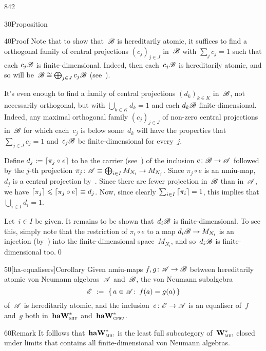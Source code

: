 \begin{parsec}{842}
\begin{point}{30}{Proposition}
\begin{point}{40}{Proof}
Note that to show that~$\mathscr{B}$ is hereditarily atomic,
it suffices to find a orthogonal family of central
projections $(c_j)_{j\in J}$ in~$\mathscr{B}$
with $\sum_j c_j=1$ 
such that  each $c_j\mathscr{B}$ is finite-dimensional.
Indeed, then each~$c_j\mathscr{B}$ is hereditarily atomic,
and so will be~$\mathscr{B}\cong \bigoplus_{j\in J} c_j\mathscr{B}$
(see~).

It's even enough to find a family of central projections
$(d_k)_{k\in K}$ in~$\mathscr{B}$,
not necessarily orthogonal, but
with $\bigcup_{k\in K} d_k =1$
and each $d_k\mathscr{B}$  finite-dimensional.
Indeed, any maximal orthogonal 
family $(c_j)_{j\in J}$
of non-zero central projections in~$\mathscr{B}$
for which each~$c_j$ is below some~$d_k$
will have the properties
that $\sum_{j\in J} c_j =1$
and~$c_j\mathscr{B}$ be finite-dimensional for every~$j$.

Define $d_j := \left\lceil\pi_j\circ e\right\rceil$
to be the carrier (see~)
of the inclusion $e\colon \mathscr{B}\to\mathscr{A}$
followed by the $j$-th projection
$\pi_j\colon \mathscr{A}\equiv\bigoplus_{i\in I}M_{N_i}\to M_{N_j}$.
Since $\pi_j\circ e$ is an nmiu-map,
    $d_j$ is a central projection by~.
Since there are fewer projection in~$\mathscr{B}$ than in~$\mathscr{A}$,
we have $\left\lceil\pi_j\right\rceil\leqslant \left\lceil\pi_j\circ e\right\rceil\equiv d_j$.
Now, since clearly $\sum_{i\in I}\left\lceil\pi_i\right\rceil=1$,
this implies that $\bigcup_{i\in I} d_i =1$.

Let~$i\in I$ be given.
It remains to be shown that~$d_i\mathscr{B}$ is finite-dimensional.
To see this, simply note that the restriction
of $\pi_i\circ e$ to a map $d_i\mathscr{B} \to M_{N_i}$
    is an injection (by~)
    into the finite-dimensional space~$M_{N_i}$,
    and so~$d_i\mathscr{B}$ is finite-dimensional too.\qed
\end{point}
\end{point}
\begin{point}{50}[ha-equalisers]{Corollary}%
Given nmiu-maps
$f,g\colon \mathscr{A}\to\mathscr{B}$
between hereditarily atomic
von Neumann algebras~$\mathscr{A}$ and~$\mathscr{B}$,
the von Neumann subalgebra
\begin{equation*}
    \mathscr{E} \ :=\  \{\,a\in\mathscr{A}\colon\, f(a)=g(a)\,\}
\end{equation*}
of~$\mathscr{A}$
is hereditarily atomic,
and the inclusion~$e\colon \mathscr{E}\to\mathscr{A}$
is an equaliser of~$f$ and~$g$ both in~$\mathbf{haW}^*_{\text{\textsc{miu}}}$
and~$\mathbf{haW}^*_{\text{\textsc{cpsu}}}$.
\end{point}
\begin{point}{60}{Remark}%
It folllows that~$\mathbf{haW}^*_{\text{\textsc{miu}}}$
is the least full subcategory of~$\mathbf{W}^*_{\text{\textsc{miu}}}$
closed under limits
that contains all finite-dimensional von Neumann algebras.
\end{point}
\end{parsec}
